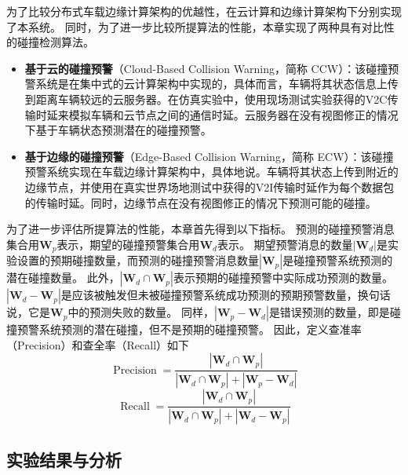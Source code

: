 为了比较分布式车载边缘计算架构的优越性，在云计算和边缘计算架构下分别实现了本系统。
同时，为了进一步比较所提算法的性能，本章实现了两种具有对比性的碰撞检测算法。
\begin{itemize}
	\item \textbf{基于云的碰撞预警}（Cloud-Based Collision Warning，简称 CCW）：该碰撞预警系统是在集中式的云计算架构中实现的，具体而言，车辆将其状态信息上传到距离车辆较远的云服务器。在仿真实验中，使用现场测试实验获得的V2C传输时延来模拟车辆和云节点之间的通信时延。云服务器在没有视图修正的情况下基于车辆状态预测潜在的碰撞预警。
	\item \textbf{基于边缘的碰撞预警}（Edge-Based Collision Warning，简称 ECW）：该碰撞预警系统实现在车载边缘计算架构中，具体地说。车辆将其状态上传到附近的边缘节点，并使用在真实世界场地测试中获得的V2I传输时延作为每个数据包的传输时延。同时，边缘节点在没有视图修正的情况下预测可能的碰撞。
\end{itemize}

为了进一步评估所提算法的性能，本章首先得到以下指标。
预测的碰撞预警消息集合用$\mathbf{W}_{p}$表示，期望的碰撞预警集合用$\mathbf{W}_{d}$表示。
期望预警消息的数量$\left| \mathbf{W}_{d} \right|$是实验设置的预期碰撞数量，而预测的碰撞预警消息数量$\left| \mathbf{W}_{p} \right|$是碰撞预警系统预测的潜在碰撞数量。
此外，$\left| \mathbf{W}_{d} \cap \mathbf{W}_{p} \right|$表示预期的碰撞预警中实际成功预测的数量。
$\left| \mathbf{W}_{d} - \mathbf{W}_{p} \right|$是应该被触发但未被碰撞预警系统成功预测的预期预警数量，换句话说，它是$\mathbf{W}_{p}$中的预测失败的数量。
同样，$\left| {\mathbf{W}_{p} - \mathbf{W}_{d}} \right|$是错误预测的数量，即是碰撞预警系统预测的潜在碰撞，但不是预期的碰撞预警。
因此，定义查准率（Precision）和查全率（Recall）如下
\begin{equation}
	\operatorname{Precision} = \frac{{\left| {\mathbf{W}_{d} \cap \mathbf{W}_{p}} \right|}}{{\left| {\mathbf{W}_{d} \cap \mathbf{W}_{p}} \right| + \left| {\mathbf{W}_{p} - \mathbf{W}_{d}} \right|}}
\end{equation}
\begin{equation}
	\operatorname{Recall} = \frac{{\left| {\mathbf{W}_{d} \cap \mathbf{W}_{p}} \right|}}{{\left| {\mathbf{W}_{d} \cap \mathbf{W}_{p}} \right| + \left| {\mathbf{W}_{d} - \mathbf{W}_{p}} \right|}}
\end{equation}



\subsection{实验结果与分析}

